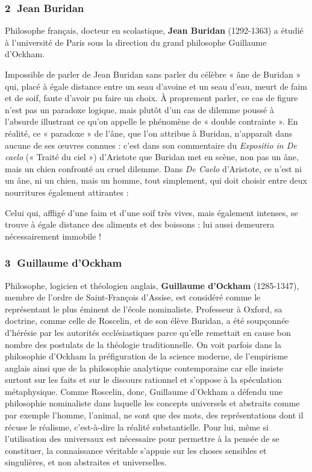 \subsubsection*{\textcircled{\scriptsize 2} Jean Buridan}
Philosophe français, docteur en scolastique, \textbf{Jean Buridan} (1292-1363) a étudié à l’université de Paris sous la direction du grand philosophe Guillaume d’Ockham.

Impossible de parler de Jean Buridan sans parler du célèbre « âne de Buridan » qui, placé à égale distance entre un seau d’avoine et un seau d’eau, meurt de faim et de soif, faute d’avoir pu faire un choix. À proprement parler, ce cas de figure n’est pas un paradoxe logique, mais plutôt d’un cas de dilemme poussé à l’absurde illustrant ce qu’on appelle le phénomène de « double contrainte ». En réalité, ce « paradoxe » de l’âne, que l’on attribue à Buridan, n’apparaît dans aucune de ses œuvres connues : c’est dans son commentaire du \textit{Expositio in De caelo} (« Traité du ciel ») d’Aristote que Buridan met en scène, non pas un âne, mais un chien confronté au cruel dilemme. Dans \textit{De Caelo} d’Aristote, ce n’est ni un âne, ni un chien, mais un homme, tout simplement, qui doit choisir entre deux nourritures également attirantes :

\begin{lecture}{}
Celui qui, affligé d’une faim et d’une soif très vives, mais également intenses, se trouve à égale distance des aliments et des boissons : lui aussi demeurera nécessairement immobile !
\end{lecture}

\subsubsection*{\textcircled{\scriptsize 3} Guillaume d’Ockham}
Philosophe, logicien et théologien anglais, \textbf{Guillaume d’Ockham} (1285-1347), membre de l’ordre de Saint-François d’Assise, est considéré comme le représentant le plus éminent de l’école nominaliste. Professeur à Oxford, sa doctrine, comme celle de Roscelin, et de son élève Buridan, a été soupçonnée d’hérésie par les autorités ecclésiastiques parce qu’elle remettait en cause bon nombre des postulats de la théologie traditionnelle. On voit parfois dans la philosophie d’Ockham la préfiguration de la science moderne, de l’empirisme anglais ainsi que de la philosophie analytique contemporaine car elle insiste surtout sur les faits et sur le discours rationnel et s’oppose à la spéculation métaphysique. Comme Roscelin, donc, Guillaume d’Ockham a défendu une philosophie nominaliste dans laquelle les concepts universels et abstraits comme par exemple l’homme, l’animal, ne sont que des mots, des représentations dont il récuse le réalisme, c’est-à-dire la réalité substantielle. Pour lui, même si l’utilisation des universaux est nécessaire pour permettre à la pensée de se constituer, la connaissance véritable s’appuie sur les choses sensibles et singulières, et non abstraites et universelles.


